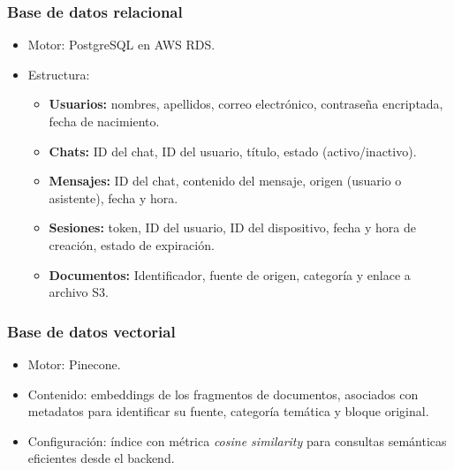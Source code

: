 \begin{enumerate}
            \subsubsection{Base de datos relacional}
            \begin{itemize}
                  \item Motor: PostgreSQL en AWS RDS.
                  \item Estructura:
                        \begin{itemize}
                              \item \textbf{Usuarios:} nombres, apellidos, correo electrónico, contraseña encriptada, fecha de nacimiento.
                              \item \textbf{Chats:} ID del chat, ID del usuario, título, estado (activo/inactivo).
                              \item \textbf{Mensajes:} ID del chat, contenido del mensaje, origen (usuario o asistente), fecha y hora.
                              \item \textbf{Sesiones:} token, ID del usuario, ID del dispositivo, fecha y hora de creación, estado de expiración.
                              \item \textbf{Documentos:} Identificador, fuente de origen, categoría y enlace a archivo S3.
                        \end{itemize}
            \end{itemize}

            \subsubsection{Base de datos vectorial}
            \begin{itemize}
                  \item Motor: Pinecone.
                  \item Contenido: embeddings de los fragmentos de documentos, asociados con metadatos
                        para identificar su fuente, categoría temática y bloque original.
                  \item Configuración: índice con métrica \textit{cosine similarity} para consultas
                        semánticas eficientes desde el backend.
            \end{itemize}


\end{enumerate}
